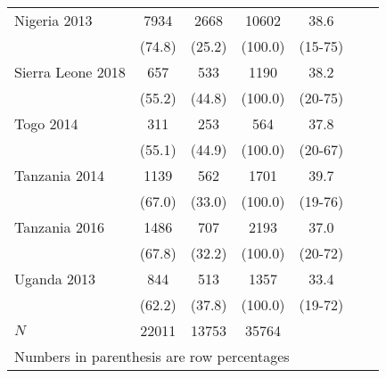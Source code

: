 \begin{tabular}{l*{6}{c}}
Nigeria 2013&                  {7934}&                {2668}&           {10602}&             {38.6}\\
&                                              {(74.8)}&      {(25.2)}&             {(100.0)}&           {(15-75)}\\
Sierra Leone 2018&             {657}&                {533}&           {1190}&             {38.2}\\
&                                              {(55.2)}&      {(44.8)}&             {(100.0)}&           {(20-75)}\\
Togo 2014&                             {311}&               {253}&           {564}&             {37.8}\\
&                                              {(55.1)}&     {(44.9)}&             {(100.0)}&           {(20-67)}\\
Tanzania 2014&                 {1139}&               {562}&           {1701}&             {39.7}\\
&                                              {(67.0)}&     {(33.0)}&             {(100.0)}&           {(19-76)}\\
Tanzania 2016&                 {1486}&               {707}&           {2193}&             {37.0}\\
&                                              {(67.8)}&     {(32.2)}&             {(100.0)}&           {(20-72)}\\
Uganda 2013&                   {844}&               {513}&           {1357}&             {33.4}\\
&                                              {(62.2)}&     {(37.8)}&             {(100.0)}&           {(19-72)}\\
\hline
\(N\)                          &       {22011}                &  {13753} &    {35764} &            {}\\
\hline\hline
\multicolumn{6}{l}{\footnotesize Numbers in parenthesis are row percentages}\\
\end{tabular}
